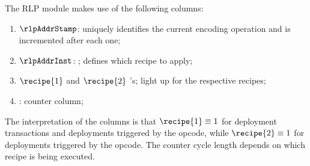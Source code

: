 The RLP module makes use of the following columns:
\begin{enumerate}
	\item $\rlpAddrStamp$: uniquely identifies the current encoding operation and is incremented after each one;
	\item $\rlpAddrInst$:
		\godGiven{}
		\ccc{}; defines which recipe to apply;
	\item $\recipe{1}$ and $\recipe{2}$
		\ccbc{}'s; light up for the respective recipes;
	\item \ct: counter column; 
\end{enumerate}
The interpretation of the  columns is that
$\recipe{1} \equiv 1$ for deployment transactions and deployments triggered by the  opcode, while
$\recipe{2} \equiv 1$ for deployments triggered by the  opcode.
The counter cycle length depends on which recipe is being executed.

